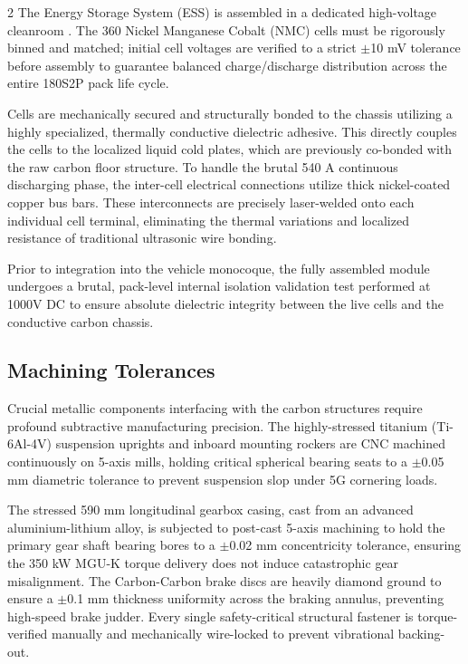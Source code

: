 \begin{multicols}{2}
The Energy Storage System (ESS) is assembled in a dedicated high-voltage cleanroom \cite{battery_pack_assembly}. The 360 Nickel Manganese Cobalt (NMC) cells must be rigorously binned and matched; initial cell voltages are verified to a strict $\pm$10 mV tolerance before assembly to guarantee balanced charge/discharge distribution across the entire 180S2P pack life cycle.

Cells are mechanically secured and structurally bonded to the chassis utilizing a highly specialized, thermally conductive dielectric adhesive. This directly couples the cells to the localized liquid cold plates, which are previously co-bonded with the raw carbon floor structure. To handle the brutal 540 A continuous discharging phase, the inter-cell electrical connections utilize thick nickel-coated copper bus bars. These interconnects are precisely laser-welded onto each individual cell terminal, eliminating the thermal variations and localized resistance of traditional ultrasonic wire bonding. 

Prior to integration into the vehicle monocoque, the fully assembled module undergoes a brutal, pack-level internal isolation validation test performed at 1000V DC to ensure absolute dielectric integrity between the live cells and the conductive carbon chassis.

\subsection{Machining Tolerances}

Crucial metallic components interfacing with the carbon structures require profound subtractive manufacturing precision. The highly-stressed titanium (Ti-6Al-4V) suspension uprights and inboard mounting rockers are CNC machined continuously on 5-axis mills, holding critical spherical bearing seats to a $\pm$0.05 mm diametric tolerance to prevent suspension slop under 5G cornering loads.

The stressed 590 mm longitudinal gearbox casing, cast from an advanced aluminium-lithium alloy, is subjected to post-cast 5-axis machining to hold the primary gear shaft bearing bores to a $\pm$0.02 mm concentricity tolerance, ensuring the 350 kW MGU-K torque delivery does not induce catastrophic gear misalignment. The Carbon-Carbon brake discs are heavily diamond ground to ensure a $\pm$0.1 mm thickness uniformity across the braking annulus, preventing high-speed brake judder. Every single safety-critical structural fastener is torque-verified manually and mechanically wire-locked to prevent vibrational backing-out.


\end{multicols}

